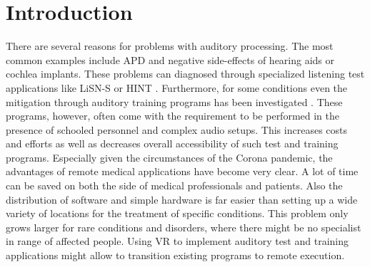 \documentclass[a4paper,11pt]{article}%
\renewcommand{\\}{\vspace*{0.5\baselineskip} \newline}
\begin{document}
\section{Introduction}
There are several reasons for problems with auditory processing. The most common examples include \ac{APD} and negative side-effects of hearing aids or cochlea implants. These problems can diagnosed through specialized listening test applications like \ac{LiSN-S} \cite{Cameron2007} or \ac{HINT} \cite{Nilsson1994}. Furthermore, for some conditions even the mitigation through auditory training programs has been investigated \cite{Tyler2010}\cite{Cameron2011}. These programs, however, often come with the requirement to be performed in the presence of schooled personnel and complex audio setups. This increases costs and efforts as well as decreases overall accessibility of such test and training programs. Especially given the circumstances of the Corona pandemic, the advantages of remote medical applications have become very clear. A lot of time can be saved on both the side of medical professionals and patients. Also the distribution of software and simple hardware is far easier than setting up a wide variety of locations for the treatment of specific conditions. This problem only grows larger for rare conditions and disorders, where there might be no specialist in range of affected people. Using \ac{VR} to implement auditory test and training applications might allow to transition existing programs to remote execution.


\end{document}
